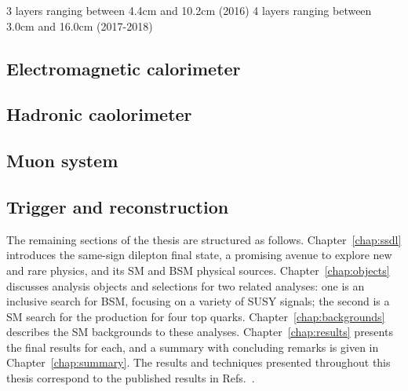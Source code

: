 3 layers ranging between 4.4cm and 10.2cm (2016)
4 layers ranging between 3.0cm and 16.0cm (2017-2018)


\subsection{Electromagnetic calorimeter}

\subsection{Hadronic caolorimeter}

\subsection{Muon system}

\subsection{Trigger and reconstruction}


The remaining sections of the thesis are structured as follows.
Chapter~\ref{chap:ssdl} introduces the same-sign dilepton final state,
a promising avenue to explore new and rare physics, and its
SM and BSM physical sources. Chapter~\ref{chap:objects} discusses analysis
objects and selections for two related analyses: one is an inclusive search
for BSM, focusing on a variety of SUSY signals; the second is a SM search for the production
for four top quarks. Chapter~\ref{chap:backgrounds} describes the
SM backgrounds to these analyses. Chapter~\ref{chap:results} presents the
final results for each, and a summary with concluding remarks is given in
Chapter~\ref{chap:summary}. The results and techniques presented throughout
this thesis correspond to the published results in
Refs.~\cite{CMS:myTOPRun2,CMS:mySUSRun2PAS,CMS:myTOP2016,CMS:mySUS2016}.